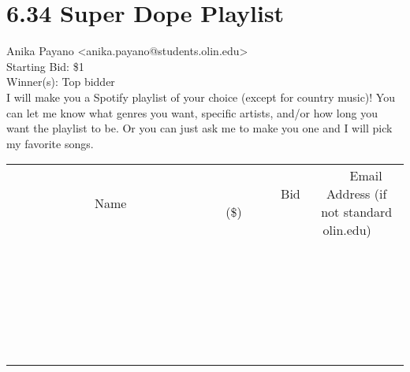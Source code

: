\documentclass[11pt]{article}
\begin{document}
					\section*{6.34 Super Dope Playlist}
					Anika Payano <anika.payano@students.olin.edu> \\
					Starting Bid: \$1 \\
					Winner(s): Top bidder \\
					I will make you a Spotify playlist of your choice (except for country music)! You can let me know what genres you want, specific artists, and/or how long you want the playlist to be. Or you can just ask me to make you one and I will pick my favorite songs. \\
					[6ex]
					\begin{tabular}{c c c}
						~~~~~~~~~~~~~Name~~~~~~~~~~~~~ & ~~~~~~~~~Bid (\$)~~~~~~~~~ & ~~~Email Address (if not standard olin.edu)~~~ \\
				
 & & \\
\hline
 & & \\
\hline
 & & \\
\hline
 & & \\
\hline
 & & \\
\hline
 & & \\
\hline
 & & \\
\hline
 & & \\
\hline
 & & \\
\hline
 & & \\
\hline
 & & \\
\hline
 & & \\
\hline
 & & \\
\hline
 & & \\
\hline
 & & \\
\hline
 & & \\
\hline
 & & \\
\hline
 & & \\
\hline
 & & \\
\hline
 & & \\
\hline
 & & \\
\hline
 & & \\
\hline
 & & \\
\hline
 & & \\
\hline
 & & \\
\hline
 & & \\
\hline
					\end{tabular}
					\clearpage
				
\end{document}
